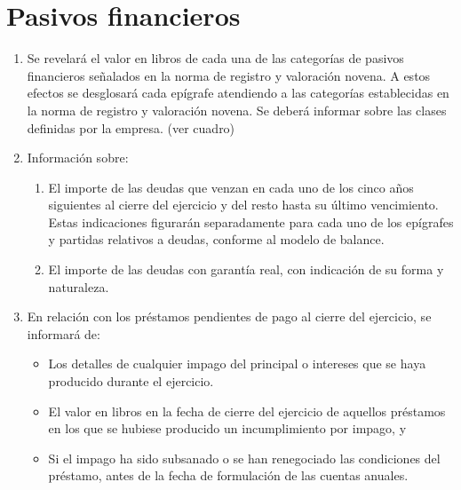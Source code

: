 \documentclass[11pt,a4paper]{article}
\begin{document}
\section{Pasivos financieros}
\begin{enumerate}
\item Se revelará el valor en libros de cada una de las categorías de pasivos financieros señalados en la norma de registro y valoración novena.
A estos efectos se desglosará cada epígrafe atendiendo a las categorías establecidas en la norma de registro y valoración novena. Se deberá informar sobre las clases definidas por la empresa.
(ver cuadro)

\item Información sobre:
   \begin{enumerate}
    \item El importe de las deudas que venzan en cada uno de los cinco años siguientes al cierre del ejercicio y del resto hasta su último vencimiento. Estas indicaciones figurarán separadamente para cada uno de los epígrafes y partidas relativos a deudas, conforme al modelo de balance.
    \item El importe de las deudas con garantía real, con indicación de su forma y naturaleza.
   \end{enumerate}

\item En relación con los préstamos pendientes de pago al cierre del ejercicio, se informará de:
 \begin{itemize}
 \item Los detalles de cualquier impago del principal o intereses que se haya producido durante el ejercicio.
 \item El valor en libros en la fecha de cierre del ejercicio de aquellos préstamos en los que se hubiese producido un incumplimiento por impago, y
 \item Si el impago ha sido subsanado o se han renegociado las condiciones del préstamo, antes de la fecha de formulación de las cuentas anuales.
 \end{itemize}
\end{enumerate}
\end{document}
